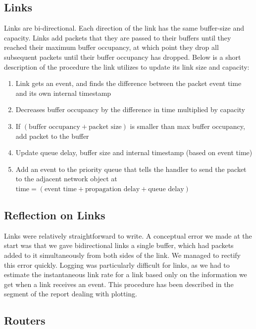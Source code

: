\documentclass[12pt]{article}
\begin{document}
\subsection{Links}

Links are bi-directional.  Each direction of the link has the same buffer-size and capacity. Links add packets that they are passed to their buffers until they reached their maximum buffer occupancy, at which point they drop all subsequent packets until their buffer occupancy has dropped. Below is a short description of the procedure the link utilizes to update its link size and capacity:

\begin{enumerate}
\item Link gets an event, and finds the difference between the packet event time and its own internal timestamp
\item Decreases buffer occupancy by the difference in time multiplied by capacity
\item If $(\text{buffer occupancy} + \text{packet size})$ is smaller than max buffer occupancy, add packet to the buffer
\item Update queue delay, buffer size and internal timestamp (based on event time)
\item Add an event to the priority queue that tells the handler to send the packet to the adjacent network object at $\text{time} = (\text{event time} + \text{propagation delay} + \text{queue delay})$
\end{enumerate}

\subsection*{Reflection on Links}

Links were relatively straightforward to write. A conceptual error we made at the start was that we gave bidirectional links a single buffer, which had packets added to it simultaneously from both sides of the link. We managed to rectify this error quickly. Logging was particularly difficult for links, as we had to estimate the instantaneous link rate for a link based only on the information we get when a link receives an event. This procedure has been described in the segment of the report dealing with plotting. 

\subsection{Routers}
\end{document}
